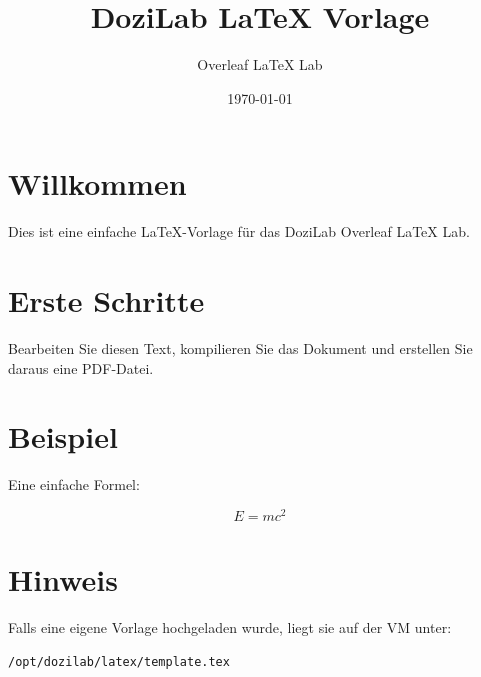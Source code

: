\documentclass[12pt,a4paper]{article}
\title{DoziLab LaTeX Vorlage}
\author{Overleaf LaTeX Lab}
\date{\today}
\begin{document}
\maketitle

\section{Willkommen}

Dies ist eine einfache LaTeX-Vorlage für das DoziLab Overleaf LaTeX Lab.

\section{Erste Schritte}

Bearbeiten Sie diesen Text, kompilieren Sie das Dokument und erstellen Sie daraus eine PDF-Datei.

\section{Beispiel}

Eine einfache Formel:

\[
  E = mc^2
\]

\section{Hinweis}

Falls eine eigene Vorlage hochgeladen wurde, liegt sie auf der VM unter:

\begin{verbatim}
/opt/dozilab/latex/template.tex
\end{verbatim}
\end{document}
